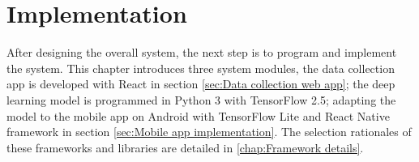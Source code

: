 \makeatletter
\let\savedchap\@makechapterhead
\def\@makechapterhead{\vspace*{-2.4cm}\savedchap}
\chapter{Implementation}
\let\@makechapterhead\savedchap
\makeatother
\vspace*{-1.5em}
\label{chap:Implementation}
After designing the overall system, the next step is to program and implement the system.
This chapter introduces three system modules, the data collection app is developed with React in section \ref{sec:Data collection web app}; the deep learning model is programmed in Python 3 with TensorFlow 2.5; adapting the model to the mobile app on Android with TensorFlow Lite and React Native framework in section \ref{sec:Mobile app implementation}.
The selection rationales of these frameworks and libraries are detailed in \ref{chap:Framework details}.


